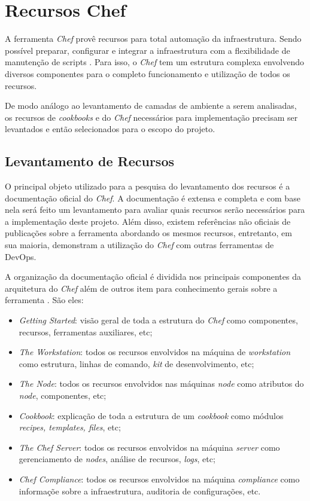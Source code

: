 \section{Recursos Chef}
\label{sec:rec-chef}

A ferramenta \textit{Chef} provê recursos para total automação da infraestrutura.
Sendo possível preparar, configurar e integrar a infraestrutura com a
flexibilidade de manutenção de scripts \cite{sharma:2015}. Para isso, o
\textit{Chef} tem um estrutura complexa envolvendo diversos componentes para
o completo funcionamento e utilização de todos os recursos.

De modo análogo ao levantamento de camadas de ambiente a serem analisadas,
os recursos de \textit{cookbooks} e do \textit{Chef} necessários para implementação precisam
ser levantados e então selecionados para o escopo do projeto.

\subsection{Levantamento de Recursos}
\label{sec:levn-rec}

O principal objeto utilizado para a pesquisa do levantamento dos recursos
é a documentação oficial do \textit{Chef}. A documentação é extensa e completa e
com base nela será feito um levantamento para avaliar quais recursos
serão necessários para a implementação deste projeto. Além disso, existem
referências não oficiais de publicações sobre a ferramenta abordando os
mesmos recursos, entretanto, em sua maioria, demonstram a utilização do
\textit{Chef} com outras ferramentas de DevOps.

A organização da documentação oficial é dividida nos principais componentes
da arquitetura do \textit{Chef} além de outros item para conhecimento gerais sobre a
ferramenta \cite{chefdoc:2016}. São eles:

\begin{itemize}
  \item \textit{Getting Started}: visão geral de toda a estrutura do \textit{Chef}
    como componentes, recursos, ferramentas auxiliares, etc;
  \item \textit{The Workstation}: todos os recursos envolvidos na máquina de \textit{workstation}
    como estrutura, linhas de comando, \textit{kit} de desenvolvimento, etc;
  \item \textit{The Node}: todos os recursos envolvidos nas máquinas \textit{node}
    como atributos do \textit{node}, componentes, etc;
  \item \textit{Cookbook}: explicação de toda a estrutura de um \textit{cookbook}
    como módulos \textit{recipes, templates, files}, etc;
  \item \textit{The Chef Server}: todos os recursos envolvidos na máquina \textit{server}
    como gerenciamento de \textit{nodes}, análise de recursos, \textit{logs}, etc;
  \item \textit{Chef Compliance}: todos os recursos envolvidos na máquina \textit{compliance}
    como informaçõe sobre a infraestrutura, auditoria de configurações, etc.
\end{itemize}

